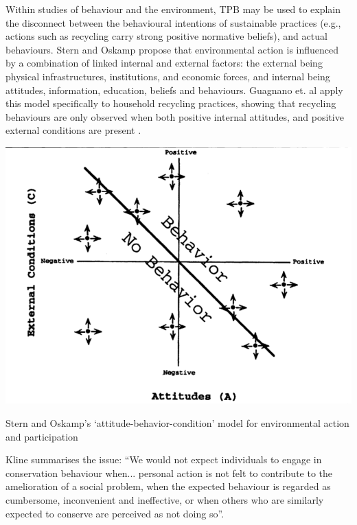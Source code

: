 \documentclass[nofonts,nols,justified,nobib]{tufte-book}
\begin{document}
Within studies of behaviour and the environment, TPB may be used to explain the disconnect between the behavioural intentions of sustainable practices (e.g., actions such as recycling carry strong positive normative beliefs), and actual behaviours. Stern and Oskamp propose that environmental action is influenced by a combination of linked internal and external factors: the external being physical infrastructures, institutions, and economic forces, and internal being attitudes, information, education, beliefs and behaviours\cite{stern_managing_1987}. Guagnano et. al apply this model specifically to household recycling practices, showing that recycling behaviours are only observed when both positive internal attitudes, and positive external conditions are present\cite{guagnano_influences_1995} .

\begin{marginfigure}
\includegraphics[width=\textwidth]{img/1/attitude-condition.png}
\caption{Stern and Oskamp's `attitude-behavior-condition' model for environmental action and participation\label{b} \cite{stern_managing_1987}}
\end{marginfigure}

Kline \cite{Kline_rationalizing_1988} summarises the issue: ``We would not expect individuals to engage in conservation behaviour when... personal action is not felt to contribute to the amelioration of a social problem, when the expected behaviour is regarded as cumbersome, inconvenient and ineffective, or when others who are similarly expected to conserve are perceived as not doing so''.

\end{document}
